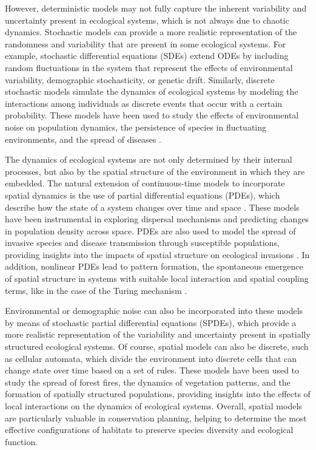 However, deterministic models may not fully capture the inherent variability
and uncertainty present in ecological systems, which is not always due to
chaotic dynamics. Stochastic models can provide a more realistic representation
of the randomness and variability that are present in some ecological systems.
For example, stochastic differential equations (SDEs) extend ODEs by including
random fluctuations in the system that represent the effects of environmental
variability, demographic stochasticity, or genetic drift. Similarly, discrete
stochastic models simulate the dynamics of ecological systems by modeling the
interactions among individuals as discrete events that occur with a certain
probability. These models have been used to study the effects of environmental
noise on population dynamics, the persistence of species in fluctuating
environments, and the spread of diseases \cite{Murray_book}.

The dynamics of ecological systems are not only determined by their internal
processes, but also by the spatial structure of the environment in which they
are embedded. The natural extension of continuous-time models to
incorporate spatial dynamics is the use of partial differential equations
(PDEs), which describe how the state of a system changes over time and
space \cite{Murray_book}. These models have been instrumental in exploring
dispersal mechanisms and predicting changes in population density across space.
PDEs are also used to model the spread of invasive species and disease
transmission through susceptible populations, providing insights into the
impacts of spatial structure on ecological invasions \cite{tilman1997spatial}.
In addition, nonlinear PDEs lead to pattern formation, the spontaneous
emergence of spatial structure in systems with suitable local interaction and
spatial coupling terms, like in the case of the Turing mechanism
\cite{turing1952chemical}.

Environmental or demographic noise can also be incorporated into these models
by means of stochastic partial differential equations (SPDEs), which provide a
more realistic representation of the variability and uncertainty present in
spatially structured ecological systems. Of course, spatial models can also
be discrete, such as cellular automata, which divide the environment into
discrete cells that can change state over time based on a set of rules. These
models have been used to study the spread of forest fires, the dynamics of
vegetation patterns, and the formation of spatially structured populations,
providing insights into the effects of local interactions on the dynamics of
ecological systems. Overall, spatial models are particularly valuable in
conservation planning, helping to determine the most effective configurations
of habitats to preserve species diversity and ecological function.


